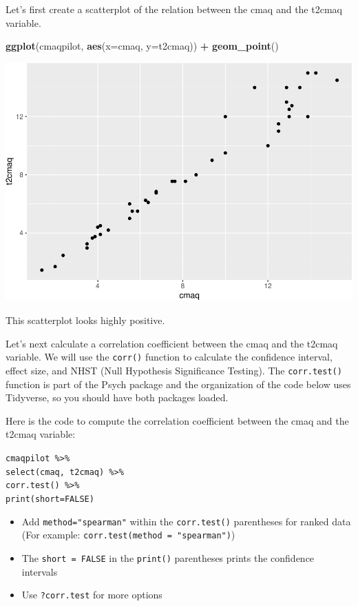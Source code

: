 \documentclass[
]{book}
\newenvironment{Shaded}{\begin{snugshade}}{\end{snugshade}}
\newcommand{\DataTypeTok}[1]{\textcolor[rgb]{0.13,0.29,0.53}{#1}}
\newcommand{\KeywordTok}[1]{\textcolor[rgb]{0.13,0.29,0.53}{\textbf{#1}}}
\newcommand{\NormalTok}[1]{#1}
\newcommand{\OperatorTok}[1]{\textcolor[rgb]{0.81,0.36,0.00}{\textbf{#1}}}
\newcommand{\StringTok}[1]{\textcolor[rgb]{0.31,0.60,0.02}{#1}}
\providecommand{\tightlist}{%
  \setlength{\itemsep}{0pt}\setlength{\parskip}{0pt}}
\begin{document}
Let's first create a scatterplot of the relation between the cmaq and the t2cmaq variable.

\begin{Shaded}
\begin{Highlighting}[]
\KeywordTok{ggplot}\NormalTok{(cmaqpilot, }\KeywordTok{aes}\NormalTok{(}\DataTypeTok{x=}\NormalTok{cmaq, }\DataTypeTok{y=}\NormalTok{t2cmaq)) }\OperatorTok{+}
\StringTok{  }\KeywordTok{geom_point}\NormalTok{()}
\end{Highlighting}
\end{Shaded}

\includegraphics{Tools-for-working-with-data-211_files/figure-latex/unnamed-chunk-21-1.pdf}

This scatterplot looks highly positive.

Let's next calculate a correlation coefficient between the cmaq and the t2cmaq variable. We will use the \texttt{corr()} function to calculate the confidence interval, effect size, and NHST (Null Hypothesis Significance Testing). The \texttt{corr.test()} function is part of the Psych package and the organization of the code below uses Tidyverse, so you should have both packages loaded.

Here is the code to compute the correlation coefficient between the cmaq and the t2cmaq variable:

\texttt{cmaqpilot\ \%\textgreater{}\%}\\
\texttt{select(cmaq,\ t2cmaq)\ \%\textgreater{}\%}~\\
\texttt{corr.test()\ \%\textgreater{}\%}~\\
\texttt{print(short=FALSE)}

\begin{itemize}
\tightlist
\item
  Add \texttt{method="spearman"} within the \texttt{corr.test()} parentheses for ranked data (For example: \texttt{corr.test(method\ =\ "spearman")})
\item
  The \texttt{short\ =\ FALSE} in the \texttt{print()} parentheses prints the confidence intervals
\item
  Use \texttt{?corr.test} for more options
\end{itemize}
\end{document}
